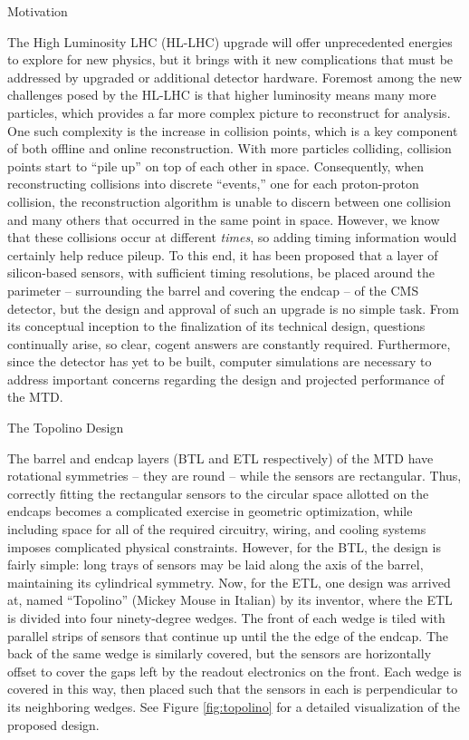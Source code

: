 \begin{section}{Motivation}

The High Luminosity LHC (HL-LHC) upgrade will offer unprecedented energies to explore for new physics, but it brings with it new complications that must be addressed by upgraded or additional detector hardware. Foremost among the new challenges posed by the HL-LHC is that higher luminosity means many more particles, which provides a far more complex picture to reconstruct for analysis. One such complexity is the increase in collision points, which is a key component of both offline and online reconstruction. With more particles colliding, collision points start to ``pile up'' on top of each other in space. Consequently, when reconstructing collisions into discrete ``events,'' one for each proton-proton collision, the reconstruction algorithm is unable to discern between one collision and many others that occurred in the same point in space. However, we know that these collisions occur at different \textit{times}, so adding timing information would certainly help reduce pileup. To this end, it has been proposed that a layer of silicon-based sensors, with sufficient timing resolutions, be placed around the parimeter -- surrounding the barrel and covering the endcap -- of the CMS detector, but the design and approval of such an upgrade is no simple task. From its conceptual inception to the finalization of its technical design, questions continually arise, so clear, cogent answers are constantly required. Furthermore, since the detector has yet to be built, computer simulations are necessary to address important concerns regarding the design and projected performance of the MTD.

\end{section}

\begin{section}{The Topolino Design}

The barrel and endcap layers (BTL and ETL respectively) of the MTD have rotational symmetries -- they are round -- while the sensors are rectangular. Thus, correctly fitting the rectangular sensors to the circular space allotted on the endcaps becomes a complicated exercise in geometric optimization, while including space for all of the required circuitry, wiring, and cooling systems imposes complicated physical constraints. However, for the BTL, the design is fairly simple: long trays of sensors may be laid along the axis of the barrel, maintaining its cylindrical symmetry. Now, for the ETL, one design was arrived at, named ``Topolino'' (Mickey Mouse in Italian) by its inventor, where the ETL is divided into four ninety-degree wedges. The front of each wedge is tiled with parallel strips of sensors that continue up until the the edge of the endcap. The back of the same wedge is similarly covered, but the sensors are horizontally offset to cover the gaps left by the readout electronics on the front. Each wedge is covered in this way, then placed such that the sensors in each is perpendicular to its neighboring wedges. See Figure \ref{fig:topolino} for a detailed visualization of the proposed design.

\end{section}

